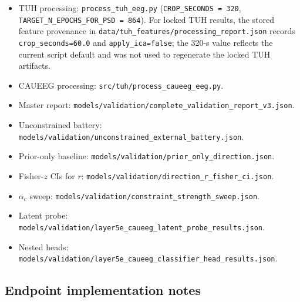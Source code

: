 \begin{itemize}
  \item TUH processing: \texttt{process\_\allowbreak{}tuh\_\allowbreak{}eeg.\allowbreak{}py} (\texttt{CROP\_\allowbreak{}SECONDS = 320}, \texttt{TARGET\_\allowbreak{}N\_\allowbreak{}EPOCHS\_\allowbreak{}FOR\_\allowbreak{}PSD = 864}). For locked TUH results, the stored feature provenance in \texttt{data/\allowbreak{}tuh\_\allowbreak{}features/\allowbreak{}processing\_\allowbreak{}report.\allowbreak{}json} records \texttt{crop\_\allowbreak{}seconds=60.\allowbreak{}0} and \texttt{apply\_\allowbreak{}ica=false}; the 320-s value reflects the current script default and was not used to regenerate the locked TUH artifacts.
  \item CAUEEG processing: \texttt{src/\allowbreak{}tuh/\allowbreak{}process\_\allowbreak{}caueeg\_\allowbreak{}eeg.\allowbreak{}py}.
  \item Master report: \texttt{models/\allowbreak{}validation/\allowbreak{}complete\_\allowbreak{}validation\_\allowbreak{}report\_\allowbreak{}v3.\allowbreak{}json}.
  \item Unconstrained battery: \texttt{models/\allowbreak{}validation/\allowbreak{}unconstrained\_\allowbreak{}external\_\allowbreak{}battery.\allowbreak{}json}.
  \item Prior-only baseline: \texttt{models/\allowbreak{}validation/\allowbreak{}prior\_\allowbreak{}only\_\allowbreak{}direction.\allowbreak{}json}.
  \item Fisher-\(z\) CIs for \(r\): \texttt{models/\allowbreak{}validation/\allowbreak{}direction\_\allowbreak{}r\_\allowbreak{}fisher\_\allowbreak{}ci.\allowbreak{}json}.
  \item \(\alpha_c\) sweep: \texttt{models/\allowbreak{}validation/\allowbreak{}constraint\_\allowbreak{}strength\_\allowbreak{}sweep.\allowbreak{}json}.
  \item Latent probe: \texttt{models/\allowbreak{}validation/\allowbreak{}layer5e\_\allowbreak{}caueeg\_\allowbreak{}latent\_\allowbreak{}probe\_\allowbreak{}results.\allowbreak{}json}.
  \item Nested heads: \texttt{models/\allowbreak{}validation/\allowbreak{}layer5e\_\allowbreak{}caueeg\_\allowbreak{}classifier\_\allowbreak{}head\_\allowbreak{}results.\allowbreak{}json}.
\end{itemize}

\subsection{Endpoint implementation notes}

